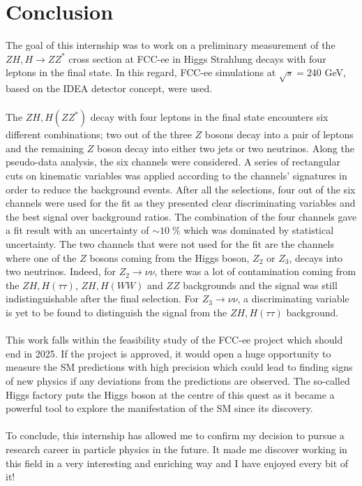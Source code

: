 \documentclass[a4paper,11pt]{article}
\begin{document}
	\section{Conclusion}
    The goal of this internship was to work on a preliminary measurement of the $ZH,H\rightarrow ZZ^*$ cross section at FCC-ee in Higgs Strahlung decays with four leptons in the final state. In this regard, FCC-ee simulations at $\sqrt{s}=240$ GeV, based on the IDEA detector concept, were used.\\\\
    The $ZH,H(ZZ^*)$ decay with four leptons in the final state encounters six different combinations; two out of the three $Z$ bosons decay into a pair of leptons and the remaining $Z$ boson decay into either two jets or two neutrinos. Along the pseudo-data analysis, the six channels were considered. A series of rectangular cuts on kinematic variables was applied according to the channels' signatures in order to reduce the background events. After all the selections, four out of the six channels were used for the fit as they presented clear discriminating variables and the best signal over background ratios. The combination of the four channels gave a fit result with an uncertainty of $\sim 10\;\%$ which was dominated by statistical uncertainty. The two channels that were not used for the fit are the channels where one of the $Z$ bosons coming from the Higgs boson, $Z_2$ or $Z_3$, decays into two neutrinos. Indeed, for $Z_2\rightarrow \nu\nu$, there was a lot of contamination coming from the $ZH,H(\tau\tau)$, $ZH,H(WW)$ and $ZZ$ backgrounds and the signal was still indistinguishable after the final selection. For $Z_3\rightarrow \nu\nu$, a discriminating variable is yet to be found to distinguish the signal from the $ZH,H(\tau\tau)$ background.\\\\
    This work falls within the feasibility study of the FCC-ee project which should end in 2025. If the project is approved, it would open a huge opportunity to measure the SM predictions with high precision which could lead to finding signs of new physics if any deviations from the predictions are observed. The so-called Higgs factory puts the Higgs boson at the centre of this quest as it became a powerful tool to explore the manifestation of the SM since its discovery.\\\\
    To conclude, this internship has allowed me to confirm my decision to pursue a research career in particle physics in the future. It made me discover working in this field in a very interesting and enriching way and I have enjoyed every bit of it!
	
\end{document}
